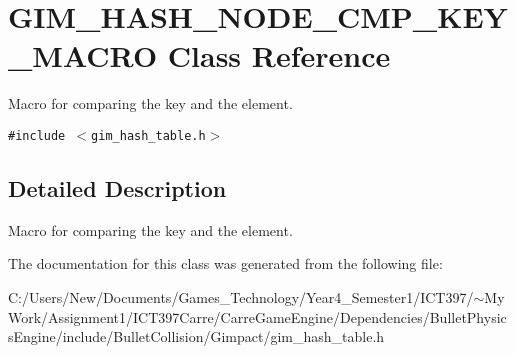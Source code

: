 \hypertarget{class_g_i_m___h_a_s_h___n_o_d_e___c_m_p___k_e_y___m_a_c_r_o}{
\section{GIM\_\-HASH\_\-NODE\_\-CMP\_\-KEY\_\-MACRO Class Reference}
\label{class_g_i_m___h_a_s_h___n_o_d_e___c_m_p___k_e_y___m_a_c_r_o}
}
Macro for comparing the key and the element.  


{\tt \#include $<$gim\_\-hash\_\-table.h$>$}



\subsection{Detailed Description}
Macro for comparing the key and the element. 

The documentation for this class was generated from the following file:\begin{CompactItemize}
\item 
C:/Users/New/Documents/Games\_\-Technology/Year4\_\-Semester1/ICT397/$\sim$My Work/Assignment1/ICT397Carre/CarreGameEngine/Dependencies/BulletPhysicsEngine/include/BulletCollision/Gimpact/gim\_\-hash\_\-table.h\end{CompactItemize}
